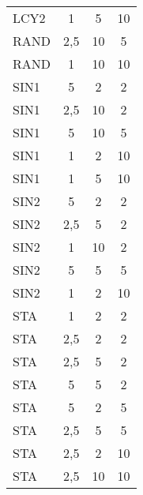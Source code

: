 \documentclass{tPRS2e}
\begin{document}
\begin{table}[h]
{\begin{tabular}{l|ccc}
			LCY2 & 1                                  & 5                           & 10                          \\
			RAND & 2,5                                & 10                          & 5                           \\
			RAND & 1                                  & 10                          & 10                          \\
			SIN1 & 5                                  & 2                           & 2                           \\
			SIN1 & 2,5                                & 10                          & 2                           \\
			SIN1 & 5                                  & 10                          & 5                           \\
			SIN1 & 1                                  & 2                           & 10                          \\
			SIN1 & 1                                  & 5                           & 10                          \\
			SIN2 & 5                                  & 2                           & 2                           \\
			SIN2 & 2,5                                & 5                           & 2                           \\
			SIN2 & 1                                  & 10                          & 2                           \\
			SIN2 & 5                                  & 5                           & 5                           \\
			SIN2 & 1                                  & 2                           & 10                          \\
			STA  & 1                                  & 2                           & 2                           \\
			STA  & 2,5                                & 2                           & 2                           \\
			STA  & 2,5                                & 5                           & 2                           \\
			STA  & 5                                  & 5                           & 2                           \\
			STA  & 5                                  & 2                           & 5                           \\
			STA  & 2,5                                & 5                           & 5                           \\
			STA  & 2,5                                & 2                           & 10                          \\
			STA  & 2,5                                & 10                          & 10                         
		\end{tabular}
	}
\end{table}



\vspace{2em}





\end{document}
